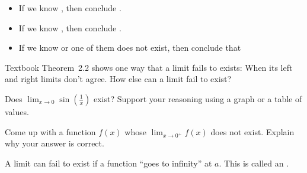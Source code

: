 \documentclass[../main.tex]{subfiles}
\begin{document}
\begin{itemize}[topsep={1ex}]
  \item If we know \underline{\hspace{2in}}, then conclude \underline{\hspace{3in}}.
    \vfill{}

  \item If we know \underline{\hspace{2in}}, then conclude \underline{\hspace{3in}}.
    \vfill{}
  \item If we know \underline{\hspace{2in}} or one of them does not exist, then conclude that 
    \vfill{}
\end{itemize}
\clearpage


Textbook Theorem~2.2 shows one way that a limit fails to exists: When its left and right limits don't agree. How else can a limit fail to exist?

\begin{example} \label{ex:limit-sin-1/x}
  Does \(\lim_{x \to 0} \sin \left(\frac{1}{x}\right) \) exist? Support your reasoning using a graph or a table of values.

\end{example}

\begin{example}
  Come up with a function \(f(x)\) whose \( \lim_{x \to 0^{+}} f(x)\) does not exist. Explain why your answer is correct. 

\end{example}

A limit can fail to exist if a function ``goes to infinity'' at \(a\). This is called an . 
\end{document}
